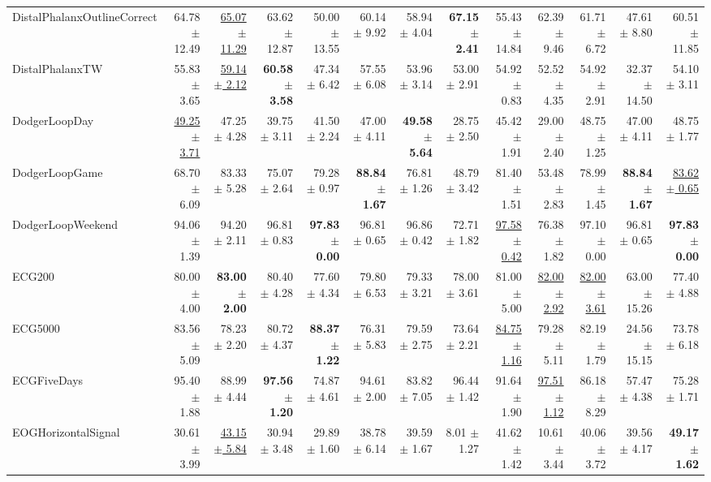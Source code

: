 \begin{landscape}
\begin{longtable}{lrrrrrrrrrrrr}
DistalPhalanxOutlineCorrect & 64.78 $\pm$ 12.49 & \underline{65.07 $\pm$ 11.29} & 63.62 $\pm$ 12.87 & 50.00 $\pm$ 13.55 & 60.14 $\pm$ 9.92 & 58.94 $\pm$ 4.04 & \textbf{67.15 $\pm$ 2.41} & 55.43 $\pm$ 14.84 & 62.39 $\pm$ 9.46 & 61.71 $\pm$ 6.72 & 47.61 $\pm$ 8.80 & 60.51 $\pm$ 11.85 \\
DistalPhalanxTW & 55.83 $\pm$ 3.65 & \underline{59.14 $\pm$ 2.12} & \textbf{60.58 $\pm$ 3.58} & 47.34 $\pm$ 6.42 & 57.55 $\pm$ 6.08 & 53.96 $\pm$ 3.14 & 53.00 $\pm$ 2.91 & 54.92 $\pm$ 0.83 & 52.52 $\pm$ 4.35 & 54.92 $\pm$ 2.91 & 32.37 $\pm$ 14.50 & 54.10 $\pm$ 3.11 \\
DodgerLoopDay & \underline{49.25 $\pm$ 3.71} & 47.25 $\pm$ 4.28 & 39.75 $\pm$ 3.11 & 41.50 $\pm$ 2.24 & 47.00 $\pm$ 4.11 & \textbf{49.58 $\pm$ 5.64} & 28.75 $\pm$ 2.50 & 45.42 $\pm$ 1.91 & 29.00 $\pm$ 2.40 & 48.75 $\pm$ 1.25 & 47.00 $\pm$ 4.11 & 48.75 $\pm$ 1.77 \\
DodgerLoopGame & 68.70 $\pm$ 6.09 & 83.33 $\pm$ 5.28 & 75.07 $\pm$ 2.64 & 79.28 $\pm$ 0.97 & \textbf{88.84 $\pm$ 1.67} & 76.81 $\pm$ 1.26 & 48.79 $\pm$ 3.42 & 81.40 $\pm$ 1.51 & 53.48 $\pm$ 2.83 & 78.99 $\pm$ 1.45 & \textbf{88.84 $\pm$ 1.67} & \underline{83.62 $\pm$ 0.65} \\
DodgerLoopWeekend & 94.06 $\pm$ 1.39 & 94.20 $\pm$ 2.11 & 96.81 $\pm$ 0.83 & \textbf{97.83 $\pm$ 0.00} & 96.81 $\pm$ 0.65 & 96.86 $\pm$ 0.42 & 72.71 $\pm$ 1.82 & \underline{97.58 $\pm$ 0.42} & 76.38 $\pm$ 1.82 & 97.10 $\pm$ 0.00 & 96.81 $\pm$ 0.65 & \textbf{97.83 $\pm$ 0.00} \\
ECG200 & 80.00 $\pm$ 4.00 & \textbf{83.00 $\pm$ 2.00} & 80.40 $\pm$ 4.28 & 77.60 $\pm$ 4.34 & 79.80 $\pm$ 6.53 & 79.33 $\pm$ 3.21 & 78.00 $\pm$ 3.61 & 81.00 $\pm$ 5.00 & \underline{82.00 $\pm$ 2.92} & \underline{82.00 $\pm$ 3.61} & 63.00 $\pm$ 15.26 & 77.40 $\pm$ 4.88 \\
ECG5000 & 83.56 $\pm$ 5.09 & 78.23 $\pm$ 2.20 & 80.72 $\pm$ 4.37 & \textbf{88.37 $\pm$ 1.22} & 76.31 $\pm$ 5.83 & 79.59 $\pm$ 2.75 & 73.64 $\pm$ 2.21 & \underline{84.75 $\pm$ 1.16} & 79.28 $\pm$ 5.11 & 82.19 $\pm$ 1.79 & 24.56 $\pm$ 15.15 & 73.78 $\pm$ 6.18 \\
ECGFiveDays & 95.40 $\pm$ 1.88 & 88.99 $\pm$ 4.44 & \textbf{97.56 $\pm$ 1.20} & 74.87 $\pm$ 4.61 & 94.61 $\pm$ 2.00 & 83.82 $\pm$ 7.05 & 96.44 $\pm$ 1.42 & 91.64 $\pm$ 1.90 & \underline{97.51 $\pm$ 1.12} & 86.18 $\pm$ 8.29 & 57.47 $\pm$ 4.38 & 75.28 $\pm$ 1.71 \\
EOGHorizontalSignal & 30.61 $\pm$ 3.99 & \underline{43.15 $\pm$ 5.84} & 30.94 $\pm$ 3.48 & 29.89 $\pm$ 1.60 & 38.78 $\pm$ 6.14 & 39.59 $\pm$ 1.67 & 8.01 $\pm$ 1.27 & 41.62 $\pm$ 1.42 & 10.61 $\pm$ 3.44 & 40.06 $\pm$ 3.72 & 39.56 $\pm$ 4.17 & \textbf{49.17 $\pm$ 1.62} \\

\end{longtable}
\end{landscape}
